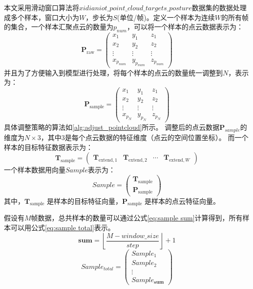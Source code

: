 本文采用滑动窗口算法将$xidianiot\_point\_cloud\_targets\_posture$数据集的数据处理成多个样本，窗口大小为$W$，步长为$S$(单位/帧)。定义一个样本为连续$W$的所有帧的集合，一个样本汇聚点云的数量为$p_{num}$，可以将一个样本的点云数据表示为：
\begin{equation}
    \mathbf{P}_{\text{raw}} = \begin{pmatrix}
        x_1 & y_1 & z_1 \\
        x_2 & y_2 & z_2 \\
        \vdots & \vdots & \vdots \\
        x_{p_{num}} & y_{p_{num}} & z_{p_{num}}
    \end{pmatrix}
\end{equation}
并且为了方便输入到模型进行处理，将每个样本的点云的数量统一调整到$N$，表示为：
\begin{equation}
    \mathbf{P}_{\text{sample}} = \begin{pmatrix}
        x_1 & y_1 & z_1 \\
        x_2 & y_2 & z_2 \\
        \vdots & \vdots & \vdots \\
        x_{p_{N}} & y_{p_{N}} & z_{p_{N}}
    \end{pmatrix}
\end{equation}
具体调整策略的算法如\eqref{alg:adjust_pointcloud}所示。
调整后的点云数据$\mathbf{P}_{sample}$的维度为$N \times 3$，其中$3$是每个点云数据的特征维度（点云的空间位置坐标）。
而一个样本的目标特征数据表示为：
\begin{equation}
    \mathbf{T}_{\text{sample}} = \begin{pmatrix}
        \mathbf{T}_{\text{extend}, 1} & \mathbf{T}_{\text{extend}, 2} & \cdots & \mathbf{T}_{\text{extend}, W}
    \end{pmatrix}
\end{equation}
一个样本数据用向量$Sample$表示为：
\begin{equation}
    Sample = \begin{pmatrix}
        \mathbf{T}_{\text{sample}} \\
        \mathbf{P}_{\text{sample}}
    \end{pmatrix} 
\end{equation}
其中，$\mathbf{T}_{\text{sample}}$ 是样本的目标特征向量，$\mathbf{P}_{\text{sample}}$ 是样本的点云特征向量。

假设有$M$帧数据，总共样本的数量可以通过公式\eqref{eq:sample sum}计算得到，所有样本可以用公式\eqref{eq:sample total}表示。
\begin{equation}
    \label{eq:sample sum}
    \mathbf{sum} = \left\lfloor \frac{M - window\_size}{step} \right\rfloor + 1
\end{equation}
\begin{equation}
    \label{eq:sample total}
    Sample_{total} = \begin{pmatrix}
        Sample_1 \\
        Sample_2 \\
        \vdots \\
        Sample_{\mathbf{sum}}
    \end{pmatrix}
\end{equation}

